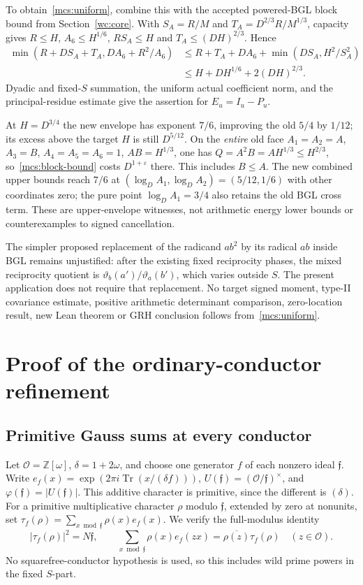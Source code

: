 \documentclass[11pt]{article}
\theoremstyle{definition}\newtheorem{definition}[theorem]{Definition}
\theoremstyle{remark}\newtheorem{remark}[theorem]{Remark}
\begin{document}
To obtain~\eqref{mcs:uniform}, combine this with the accepted powered-BGL
block bound from Section~\ref{wc:core}. With
$S_A=R/M$ and $T_A=D^{2/3}R/M^{1/3}$, capacity gives
$R\le H$, $A_6\le H^{1/6}$, $RS_A\le H$ and
$T_A\le(DH)^{2/3}$. Hence
\begin{align*}
 \min(R+DS_A+T_A,DA_6+R^2/A_6)
 &\le R+T_A+DA_6+\min(DS_A,H^2/S_A^2)\\
 &\le H+DH^{1/6}+2(DH)^{2/3}.
\end{align*}
Dyadic and fixed-$S$ summation, the uniform actual coefficient norm,
and the principal-residue estimate give the assertion for $E_u=I_u-P_u$.

At $H=D^{3/4}$ the new envelope has exponent $7/6$, improving the old
$5/4$ by $1/12$; its excess above the target $H$ is still $D^{5/12}$.
On the \emph{entire} old face $A_1=A_2=A$, $A_3=B$,
$A_4=A_5=A_6=1$, $AB=H^{1/3}$, one has
$Q=A^2B=AH^{1/3}\le H^{2/3}$, so~\eqref{mcs:block-bound} costs
$D^{1+\varepsilon}$ there. This includes $B\le A$.
The new combined upper bounds reach $7/6$ at
$(\log_D A_1,\log_D A_2)=(5/12,1/6)$ with other coordinates zero;
the pure point $\log_D A_1=3/4$ also retains the old BGL cross term.
These are upper-envelope witnesses, not arithmetic energy lower bounds
or counterexamples to signed cancellation.

The simpler proposed replacement of the radicand $ab^2$ by its radical
$ab$ inside BGL remains unjustified: after the existing fixed reciprocity
phases, the mixed reciprocity quotient is
$\vartheta_b(a')/\vartheta_a(b')$, which varies outside $S$.
The present application does not require that replacement.
No target signed moment, type-II covariance estimate, positive arithmetic
determinant comparison, zero-location result, new Lean theorem or GRH
conclusion follows from~\eqref{mcs:uniform}.

\section{Proof of the ordinary-conductor refinement}\label{mcs:details}
\subsection{Primitive Gauss sums at every conductor}
Let $\mathcal O=\mathbb Z[\omega]$, $\delta=1+2\omega$, and choose one
generator $f$ of each nonzero ideal $\mathfrak f$. Write
$e_f(x)=\exp(2\pi i\operatorname{Tr}(x/(\delta f)))$,
$U(\mathfrak f)=(\mathcal O/\mathfrak f)^\times$, and
$\varphi(\mathfrak f)=|U(\mathfrak f)|$.
This additive character is primitive, since the different is $(\delta)$.
For a primitive multiplicative character $\rho$ modulo $\mathfrak f$,
extended by zero at nonunits, set
$\tau_f(\rho)=\sum_{x\bmod\mathfrak f}\rho(x)e_f(x)$.
We verify the full-modulus identity
\begin{equation}\label{mcs:gauss}
 |\tau_f(\rho)|^2=N\mathfrak f,\qquad
 \sum_{x\bmod\mathfrak f}\rho(x)e_f(zx)
       =\overline{\rho(z)}\tau_f(\rho)\quad(z\in\mathcal O).
\end{equation}
No squarefree-conductor hypothesis is used, so this includes wild
prime powers in the fixed $S$-part.
\end{document}
